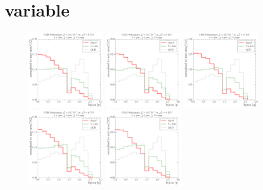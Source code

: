 \centering
\section*{\HT variable}

\begin{figure}[!htbp]
	\centering
  	{\includegraphics[width=0.3\textwidth]{measurement/HT/central/fit_templates/electron_templates_bin_0-240}}
  	{\includegraphics[width=0.3\textwidth]{measurement/HT/central/fit_templates/electron_templates_bin_240-280}}
  	{\includegraphics[width=0.3\textwidth]{measurement/HT/central/fit_templates/electron_templates_bin_280-330}}\\
  	{\includegraphics[width=0.3\textwidth]{measurement/HT/central/fit_templates/electron_templates_bin_330-380}}
  	{\includegraphics[width=0.3\textwidth]{measurement/HT/central/fit_templates/electron_templates_bin_380-450}}

\end{figure}
